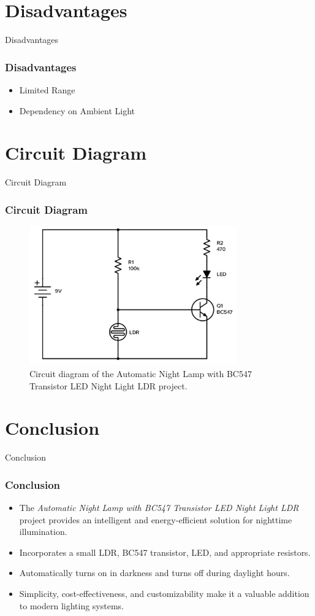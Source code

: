 \documentclass{beamer}
\begin{document}
\section{Disadvantages}
\begin{frame}{Disadvantages}
  \frametitle{Disadvantages}
  \begin{itemize}
    \item Limited Range
    \item Dependency on Ambient Light
  \end{itemize}
\end{frame}

\section{Circuit Diagram}
\begin{frame}{Circuit Diagram}
  \frametitle{Circuit Diagram}
  \begin{figure}[htbp]
    \centering
    \includegraphics[width=0.8\textwidth]{1.png}
    \caption{Circuit diagram of the Automatic Night Lamp with BC547 Transistor LED Night Light LDR project.}
  \end{figure}
\end{frame}

\section{Conclusion}
\begin{frame}{Conclusion}
  \frametitle{Conclusion}
  \begin{itemize}
    \item The \textit{Automatic Night Lamp with BC547 Transistor LED Night Light LDR} project provides an intelligent and energy-efficient solution for nighttime illumination.
    \item Incorporates a small LDR, BC547 transistor, LED, and appropriate resistors.
    \item Automatically turns on in darkness and turns off during daylight hours.
    \item Simplicity, cost-effectiveness, and customizability make it a valuable addition to modern lighting systems.
  \end{itemize}
\end{frame}
\end{document}
